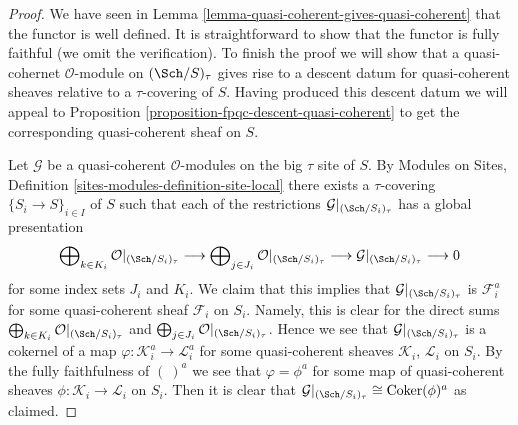 \begin{proof}
We have seen in Lemma \ref{lemma-quasi-coherent-gives-quasi-coherent}
that the functor is well defined.
It is straightforward to show that the functor is fully faithful (we omit
the verification). To finish the proof we will show that a
quasi-cohernet $\mathcal{O}$-module on $(\Sch/S)_\tau$ gives
rise to a descent datum for quasi-coherent sheaves relative to a
$\tau$-covering of $S$. Having produced this descent datum we will appeal
to Proposition \ref{proposition-fpqc-descent-quasi-coherent} to get the
corresponding quasi-coherent sheaf on $S$.

\medskip\noindent
Let $\mathcal{G}$ be a quasi-coherent $\mathcal{O}$-modules on
the big $\tau$ site of $S$. By
Modules on Sites, Definition \ref{sites-modules-definition-site-local}
there exists a $\tau$-covering $\{S_i \to S\}_{i \in I}$ of $S$
such that each of the restrictions
$\mathcal{G}|_{(\Sch/S_i)_\tau}$ has a global presentation
$$
\bigoplus\nolimits_{k \in K_i} \mathcal{O}|_{(\Sch/S_i)_\tau}
\longrightarrow
\bigoplus\nolimits_{j \in J_i} \mathcal{O}|_{(\Sch/S_i)_\tau}
\longrightarrow
\mathcal{G}|_{(\Sch/S_i)_\tau} \longrightarrow 0
$$
for some index sets $J_i$ and $K_i$. We claim that this implies
that $\mathcal{G}|_{(\Sch/S_i)_\tau}$ is $\mathcal{F}_i^a$
for some quasi-coherent sheaf $\mathcal{F}_i$ on $S_i$. Namely,
this is clear for the direct sums
$\bigoplus\nolimits_{k \in K_i} \mathcal{O}|_{(\Sch/S_i)_\tau}$
and
$\bigoplus\nolimits_{j \in J_i} \mathcal{O}|_{(\Sch/S_i)_\tau}$.
Hence we see that $\mathcal{G}|_{(\Sch/S_i)_\tau}$ is a
cokernel of a map $\varphi : \mathcal{K}_i^a \to \mathcal{L}_i^a$
for some quasi-coherent sheaves $\mathcal{K}_i$, $\mathcal{L}_i$
on $S_i$. By the fully faithfulness of $(\ )^a$ we see that
$\varphi = \phi^a$ for some map of quasi-coherent sheaves
$\phi : \mathcal{K}_i \to \mathcal{L}_i$ on $S_i$. Then it is
clear that
$\mathcal{G}|_{(\Sch/S_i)_\tau} \cong \text{Coker}(\phi)^a$
as claimed.


\end{proof}
